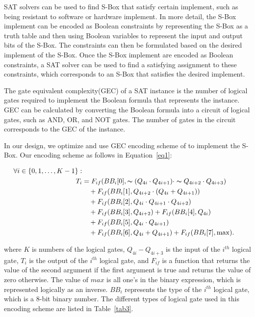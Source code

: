 \documentclass[sn-basic]{sn-jnl}%
\begin{document}
SAT solvers can be used to find S-Box that satisfy certain implement, such as being resistant to software or hardware implement.
In more detail, the S-Box implement can be encoded as Boolean constraints by representing the S-Box as a truth table and then using Boolean variables to represent the input and output bits of the S-Box.
The constraints can then be formulated based on the desired implement of the S-Box.
Once the S-Box implement are encoded as Boolean constraints, a SAT solver can be used to find a satisfying assignment to these constraints, which corresponds to an S-Box that satisfies the desired implement.

The gate equivalent complexity(GEC) of a SAT instance is the number of logical gates required to implement the Boolean formula that represents the instance.
GEC can be calculated by converting the Boolean formula into a circuit of logical gates, such as AND, OR, and NOT gates.
The number of gates in the circuit corresponds to the GEC of the instance.

In our design, we optimize and use GEC encoding scheme of \cite{bib16} to implement the S-Box.
Our encoding scheme as follows in Equation~\ref{eq1}:

\begin{align}
    \forall i \in \{0,1,\ldots ,K-1\}: \nonumber                                                                  \\
    T_i & = F_{if} (BB_i[0], \thicksim (Q_{4i} \cdot Q_{4i+1}) \cdot \thicksim Q_{4i+2} \cdot Q_{4i+3}) \nonumber \\
        & \quad + F_{if} (BB_i[1], Q_{4i+2} \cdot (Q_{4i} + Q_{4i+1})) \nonumber                                  \\
        & \quad + F_{if} (BB_i[2], Q_{4i} \cdot Q_{4i+1} \cdot Q_{4i+2}) \nonumber                                \\
        & \quad + F_{if} (BB_i[3], Q_{4i+2}) + F_{if} (BB_i[4], Q_{4i}) \nonumber                                 \\
        & \quad + F_{if} (BB_i[5], Q_{4i} \cdot Q_{4i+1}) \nonumber                                               \\
        & \quad + F_{if} (BB_i[6], Q_{4i} + Q_{4i+1}) + F_{if} (BB_i[7], \max). \label{eq1}
\end{align}

where $K$ is numbers of the logical gates, $Q_{4i}-Q_{4i+3}$ is the input of the $i^{th}$ logical gate, $T_i$ is the output of the $i^{th}$ logical gate, and $F_{if}$ is a function that returns the value of the second argument if the first argument is true and returns the value of zero otherwise.
The value of $max$ is all one's in the binary expression, which is represented logically as an inverse.
$BB_i$ represents the type of the $i^{th}$ logical gate, which is a 8-bit binary number. The different types of logical gate used in this encoding scheme are listed in Table~\ref{tab3}.
\end{document}
